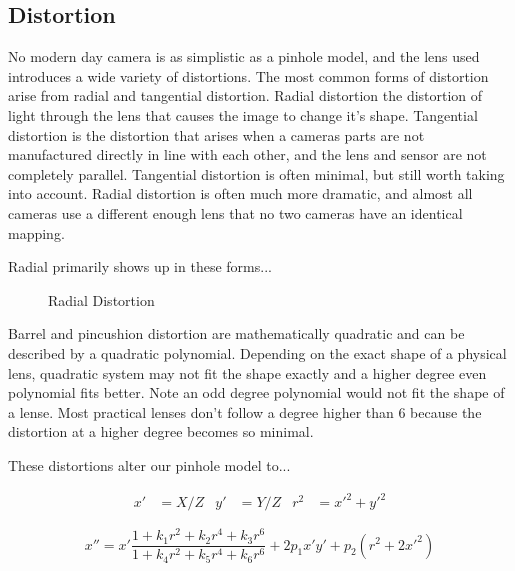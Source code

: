 \documentclass{article}
\begin{document}
\subsection{Distortion}

No modern day camera is as simplistic as a pinhole model, and the lens used introduces a wide variety of distortions. The most common forms of distortion arise from radial and tangential distortion. Radial distortion the distortion of light through the lens that causes the image to change it's shape. Tangential distortion is the distortion that arises when a cameras parts are not manufactured directly in line with each other, and the lens and sensor are not completely parallel. Tangential distortion is often minimal, but still worth taking into account. Radial distortion is often much more dramatic, and almost all cameras use a different enough lens that no two cameras have an identical mapping. 

Radial primarily shows up in these forms...

\begin{figure}[h]
	\centering
	\caption{Radial Distortion}
	\label{fig:radial}
\end{figure}

Barrel and pincushion distortion are mathematically quadratic and can be described by a quadratic polynomial. Depending on the exact shape of a physical lens,  quadratic system may not fit the shape exactly and a higher degree even polynomial fits better. Note an odd degree polynomial would not fit the shape of a lense.  Most practical lenses don't follow a degree higher than 6 because the distortion at a higher degree becomes so minimal. 

These distortions alter our pinhole model to...

\begin{align*}
x'&= X/Z & y'&= Y/Z & r^2 &= x'^2 + y'^2
\end{align*}

\[
x'' = x' \frac{1+k_1r^2+k_2r^4+k_3r^6}{1+k_4r^2+k_5r^4+k_6r^6} + 2p_1x'y' + p_2(r^2 + 2x'^2)
\]
\end{document}
